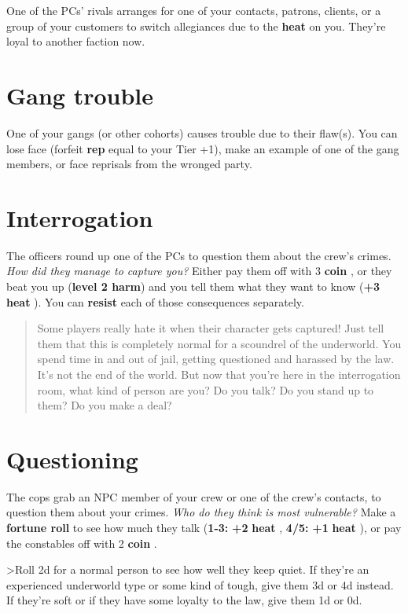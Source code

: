 \documentclass[11pt,fleqn,a5paper]{book}
\newcommand{\gameterm}[1]{\textbf{#1}}
\begin{document}
One of the PCs’ rivals arranges for one of your contacts, patrons, clients, or a group of your customers to switch allegiances due to the \gameterm{heat}  on you. They’re loyal to another faction now.

\section{Gang trouble}

One of your gangs (or other cohorts) causes trouble due to their flaw(s). You can lose face (forfeit\gameterm{ rep}  equal to your Tier +1), make an example of one of the gang members, or face reprisals from the wronged party.

\section{Interrogation}

The officers round up one of the PCs to question them about the crew’s crimes. \emph{How did they manage to capture you?} Either pay them off with 3 \gameterm{coin} , or they beat you up (\textbf{level 2 harm}) and you tell them what they want to know (\textbf{+3} \gameterm{heat} ). You can \textbf{resist} each of those consequences separately.

\begin{quote}
	Some players really hate it when their character gets captured! Just tell them that this is completely normal for a scoundrel of the underworld. You spend time in and out of jail, getting questioned and harassed by the law. It’s not the end of the world. But now that you’re here in the interrogation room, what kind of person are you? Do you talk? Do you stand up to them? Do you make a deal?
\end{quote} 

\section{Questioning}

The cops grab an NPC member of your crew or one of the crew’s contacts, to question them about your crimes. \emph{Who do they think is most vulnerable?} Make a \textbf{fortune roll} to see how much they talk (\gameterm{1-3:}  \textbf{+2} \gameterm{heat} , \gameterm{4/5:}  \textbf{+1} \gameterm{heat} ), or pay the constables off with 2 \gameterm{coin} .

>Roll 2d for a normal person to see how well they keep quiet. If they’re an experienced underworld type or some kind of tough, give them 3d or 4d instead. If they’re soft or if they have some loyalty to the law, give them 1d or 0d.
\end{document}
